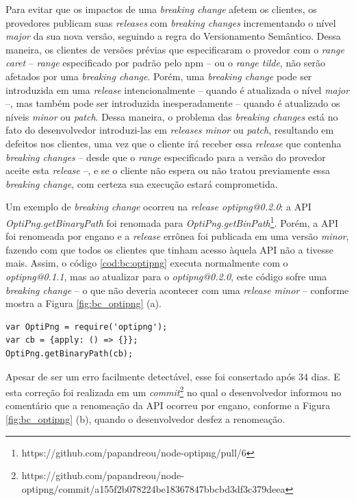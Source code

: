 Para evitar que os impactos de uma \textit{breaking change} afetem os clientes, os provedores publicam suas \textit{releases} com \textit{breaking changes} incrementando o nível \textit{major} da sua nova versão, seguindo a regra do Versionamento Semântico. Dessa maneira, os clientes de versões prévias que especificaram o provedor com o \textit{range caret} -- \textit{range} especificado por padrão pelo \gls{npm} -- ou o \textit{range tilde}, não serão afetados por uma \textit{breaking change}. Porém, uma \textit{breaking change} pode ser introduzida em uma \textit{release} intencionalmente -- quando é atualizada o nível \textit{major} --, mas também pode ser introduzida inesperadamente -- quando é atualizado os níveis \textit{minor} ou \textit{patch}. Dessa maneira, o problema das \textit{breaking changes} está no fato do desenvolvedor introduzi-las em \textit{releases minor} ou \textit{patch}, resultando em defeitos nos clientes, uma vez que o cliente irá receber essa \textit{release} que contenha \textit{breaking changes} -- desde que o \textit{range} especificado para a versão do provedor aceite esta \textit{release} --, e se o cliente não espera ou não tratou previamente essa \textit{breaking change}, com certeza sua execução estará comprometida.

Um exemplo de \textit{breaking change} ocorreu na \textit{release optipng@0.2.0}: a \gls{API} \textit{OptiPng.getBinaryPath} foi renomada para \textit{OptiPng.getBinPath}\footnote{https://github.com/papandreou/node-optipng/pull/6}. Porém, a \gls{API} foi renomeada por engano e a \textit{release} errônea foi publicada em uma versão \textit{minor}, fazendo com que todos os clientes que tinham acesso àquela \gls{API} não a tivesse mais. Assim, o código \ref{cod:bc:optipng} executa normalmente com o \textit{optipng@0.1.1}, mas ao atualizar para o \textit{optipng@0.2.0}, este código sofre uma \textit{breaking change} -- o que não deveria acontecer com uma \textit{release minor}  -- conforme mostra a Figura \ref{fig:bc_optipng} (a).

\begin{lstlisting}[style=Javascript, label=cod:bc:optipng, caption={Código que sofre \textit{breaking change} do \textit{optipng}}]
var OptiPng = require('optipng');
var cb = {apply: () => {}};
OptiPng.getBinaryPath(cb);
\end{lstlisting}

Apesar de ser um erro facilmente detectável, esse foi consertado após 34 dias. E esta correção foi realizada em um \textit{commit}\footnote{https://github.com/papandreou/node-optipng/commit/a155f2b078224be18367847bbcbd3df3c379deea} no qual o desenvolvedor informou no comentário que a renomeação da \gls{API} ocorreu por engano, conforme a Figura \ref{fig:bc_optipng} (b), quando o desenvolvedor desfez a renomeação.

